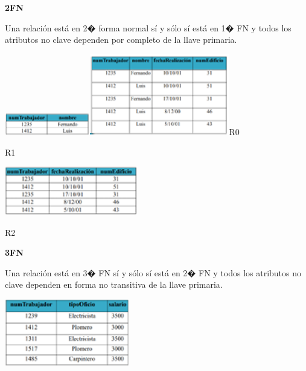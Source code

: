 \documentclass{article} %
\begin{document}
\noindent 

\noindent 

\noindent \textbf{}

\noindent \textbf{}

\noindent \textbf{}

\noindent \textbf{}

\noindent \textbf{2FN}

\noindent 

\noindent Una relaci\'{o}n est\'{a} en 2� forma normal s\'{i} y s\'{o}lo s\'{i} est\'{a} en 1� FN y todos los atributos no clave dependen por completo de la llave primaria.

\noindent \includegraphics*[width=1.47in, height=0.39in, keepaspectratio=false]{image3}\includegraphics*[width=2.40in, height=1.40in, keepaspectratio=false]{image4}R0           

  R1

\noindent 

\noindent \includegraphics*[width=2.29in, height=0.84in, keepaspectratio=false]{image5}

  R2

\noindent 

\noindent 

\noindent 

\noindent 

\noindent \eject \textbf{3FN}

\noindent 

\noindent Una relaci\'{o}n est\'{a} en 3� FN s\'{i} y s\'{o}lo s\'{i} est\'{a} en 2� FN y todos los atributos no clave dependen en forma no transitiva de la llave primaria.

\noindent \includegraphics*[width=2.15in, height=1.16in, keepaspectratio=false]{image6}
\end{document}
